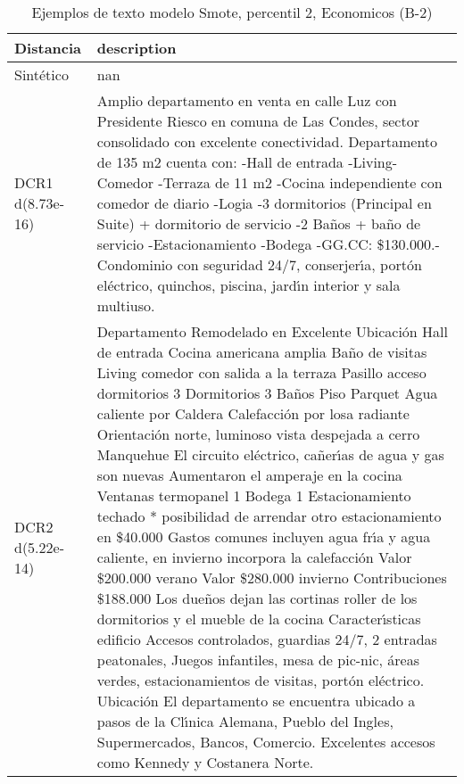 \begin{table}[H]
\centering
\fontsize{10}{14}\selectfont
\caption{Ejemplos de texto modelo Smote, percentil 2, Economicos (B-2)}
\label{table-example-economicos-b-2-smote-enc-2p-text}
\begin{tabular}{|l|m{35em}|}
\hline
\rowcolor[gray]{0.8}
Distancia & description \\
\hline Sintético & nan \\
\hline DCR1 d(8.73e-16) & Amplio departamento en venta en calle Luz con Presidente Riesco en comuna de Las Condes, sector consolidado con excelente conectividad.  Departamento de 135 m2 cuenta con: -Hall de entrada -Living-Comedor -Terraza de 11 m2 -Cocina independiente con comedor de diario -Logia -3 dormitorios (Principal en Suite) + dormitorio de servicio -2 Ba\~nos + ba\~no de servicio -Estacionamiento -Bodega -GG.CC: \$130.000.-  Condominio con seguridad 24/7, conserjer{\'\i}a, port\'on el\'ectrico, quinchos, piscina, jard{\'\i}n interior y sala multiuso. \\
\hline DCR2 d(5.22e-14) & Departamento Remodelado en Excelente Ubicaci\'on   Hall de entrada Cocina americana amplia  Ba\~no de visitas  Living comedor con salida a la terraza Pasillo acceso dormitorios  3 Dormitorios 3 Ba\~nos   Piso Parquet Agua caliente por Caldera  Calefacci\'on por losa radiante   Orientaci\'on norte, luminoso vista despejada a cerro Manquehue   El circuito el\'ectrico, ca\~ner{\'\i}as de agua y gas son nuevas  Aumentaron el amperaje en la cocina  Ventanas termopanel  1 Bodega  1 Estacionamiento techado * posibilidad de arrendar otro estacionamiento en \$40.000  Gastos comunes incluyen agua fr{\'\i}a y agua caliente, en invierno incorpora la calefacci\'on  Valor \$200.000 verano  Valor \$280.000 invierno  Contribuciones \$188.000  Los due\~nos dejan las cortinas roller de los dormitorios y el mueble de la cocina   Caracter{\'\i}sticas edificio  Accesos controlados, guardias 24/7, 2 entradas peatonales, Juegos infantiles, mesa de pic-nic, \'areas verdes, estacionamientos de visitas, port\'on el\'ectrico.  Ubicaci\'on El departamento se encuentra ubicado a pasos de la Cl{\'\i}nica Alemana, Pueblo del Ingles, Supermercados, Bancos, Comercio. Excelentes accesos como Kennedy y Costanera Norte. \\
\hline
\end{tabular}
\end{table}
